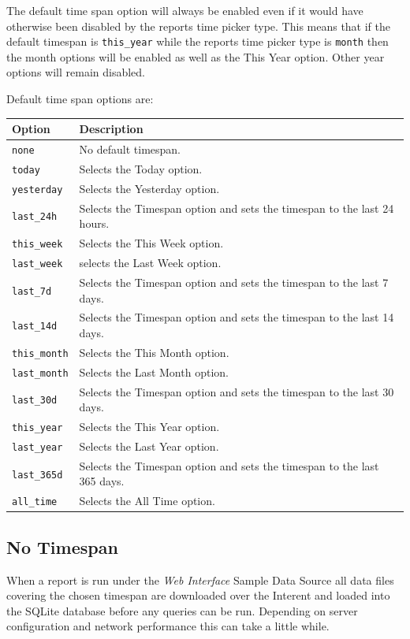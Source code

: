 \documentclass[a4paper,10pt]{book}
\begin{document}
The default time span option will always be enabled even if it would have otherwise been disabled by the reports time picker type. This means that if the default timespan is \verb|this_year| while the reports time picker type is \verb|month| then the month options will be enabled as well as the This Year option. Other year options will remain disabled.


Default time span options are:

\begin{tabular}{p{2.5cm} l}
\hline
\textbf{Option} & \textbf{Description} \\
\hline
\verb|none| & No default timespan.\\
\verb|today| & Selects the Today option.\\
\verb|yesterday| & Selects the Yesterday option.\\
\verb|last_24h|  & Selects the Timespan option and sets the timespan to the last 24 hours.\\
\verb|this_week| & Selects the This Week option.\\
\verb|last_week| & selects the Last Week option.\\
\verb|last_7d| & Selects the Timespan option and sets the timespan to the last 7 days.\\
\verb|last_14d| & Selects the Timespan option and sets the timespan to the last 14 days.\\
\verb|this_month| & Selects the This Month option.\\
\verb|last_month| & Selects the Last Month option.\\
\verb|last_30d| & Selects the Timespan option and sets the timespan to the last 30 days.\\
\verb|this_year| & Selects the This Year option.\\
\verb|last_year| & Selects the Last Year option.\\
\verb|last_365d| & Selects the Timespan option and sets the timespan to the last 365 days.\\
\verb|all_time| & Selects the All Time option.\\
\hline
\end{tabular}

\subsection{No Timespan}
\label{sec_no_timespan}
When a report is run under the \emph{Web Interface} Sample Data Source all data files covering the chosen timespan are downloaded over the Interent and loaded into the SQLite database before any queries can be run. Depending on server configuration and network performance this can take a little while.
\end{document}
